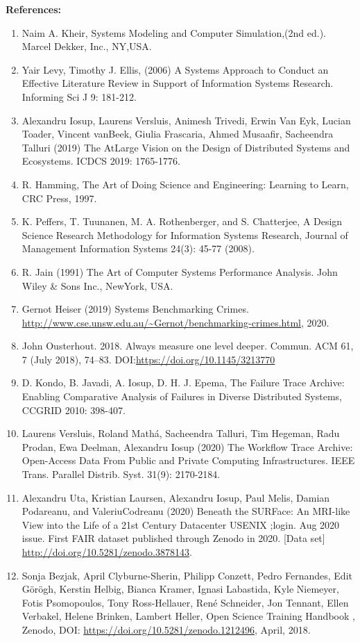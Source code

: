 \documentclass[11pt]{article}
\begin{document}
\noindent\textbf{References:}
\begin{enumerate}
    \item Naim A. Kheir, Systems Modeling and Computer Simulation,(2nd ed.). Marcel Dekker, Inc., NY,USA.
    \item Yair Levy, Timothy J. Ellis, (2006) A Systems Approach to Conduct an Effective Literature Review in Support of Information Systems Research. Informing Sci J 9: 181-212.
    \item Alexandru Iosup, Laurens Versluis, Animesh Trivedi, Erwin Van Eyk, Lucian Toader, Vincent vanBeek, Giulia Frascaria, Ahmed Musaafir, Sacheendra Talluri (2019) The AtLarge Vision on the Design of Distributed Systems and Ecosystems. ICDCS 2019: 1765-1776.
    \item R. Hamming, The Art of Doing Science and Engineering: Learning to Learn, CRC Press, 1997.
    \item K. Peffers, T. Tuunanen, M. A. Rothenberger, and S. Chatterjee, A Design Science Research Methodology for Information Systems Research, Journal of Management Information Systems 24(3): 45-77 (2008).
    \item R. Jain (1991) The Art of Computer Systems Performance Analysis. John Wiley \& Sons Inc., NewYork, USA.
    \item Gernot Heiser (2019) Systems Benchmarking Crimes. \url{http://www.cse.unsw.edu.au/~Gernot/benchmarking-crimes.html}, 2020. 
    \item John Ousterhout. 2018. Always measure one level deeper. Commun. ACM 61, 7 (July 2018), 74–83. DOI:\url{https://doi.org/10.1145/3213770}
    \item D. Kondo, B. Javadi, A. Iosup, D. H. J. Epema, The Failure Trace Archive: Enabling Comparative Analysis of Failures in Diverse Distributed Systems, CCGRID 2010: 398-407.
    \item Laurens Versluis, Roland Mathá, Sacheendra Talluri, Tim Hegeman, Radu Prodan, Ewa Deelman, Alexandru Iosup (2020) The Workflow Trace Archive: Open-Access Data From Public and Private Computing Infrastructures. IEEE Trans. Parallel Distrib. Syst. 31(9): 2170-2184.
    \item Alexandru Uta, Kristian Laursen, Alexandru Iosup, Paul Melis, Damian Podareanu, and ValeriuCodreanu (2020) Beneath the SURFace: An MRI-like View into the Life of a 21st Century Datacenter USENIX ;login. Aug 2020 issue. First FAIR dataset published through Zenodo in 2020.  [Data set] \url{http://doi.org/10.5281/zenodo.3878143}.
    \item Sonja Bezjak, April Clyburne-Sherin, Philipp Conzett, Pedro Fernandes, Edit Görögh, Kerstin Helbig, Bianca Kramer, Ignasi Labastida, Kyle Niemeyer, Fotis Psomopoulos, Tony Ross-Hellauer, René Schneider, Jon Tennant, Ellen Verbakel, Helene Brinken, Lambert Heller, Open Science Training Handbook , Zenodo, DOI: \url{https://doi.org/10.5281/zenodo.1212496}, April, 2018.

\end{enumerate}
\end{document}
